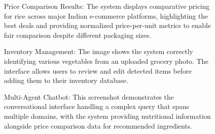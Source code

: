 \documentclass[10pt,twocolumn,letterpaper]{article}
\begin{document}
\begin{figure}[h]
\centering
{}
\caption{Price Comparison Results: The system displays comparative pricing for rice across major Indian e-commerce platforms, highlighting the best deals and providing normalized price-per-unit metrics to enable fair comparison despite different packaging sizes.}
\end{figure}

\begin{figure}[h]
\centering
{}
\caption{Inventory Management: The image shows the system correctly identifying various vegetables from an uploaded grocery photo. The interface allows users to review and edit detected items before adding them to their inventory database.}
\end{figure}

\begin{figure}[h]
\centering
{}
\caption{Multi-Agent Chatbot: This screenshot demonstrates the conversational interface handling a complex query that spans multiple domains, with the system providing nutritional information alongside price comparison data for recommended ingredients.}
\end{figure}
\end{document}
